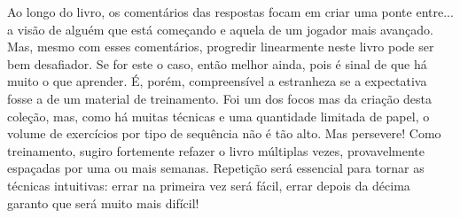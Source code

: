 \documentclass{book}
\begin{document}
  Ao longo do livro, os comentários das respostas focam em criar uma ponte entre... a visão de alguém que está começando e aquela de um jogador mais avançado. Mas, mesmo com esses comentários, progredir linearmente neste livro pode ser bem desafiador. Se for este o caso, então melhor ainda, pois é sinal de que há muito o que aprender. É, porém, compreensível a estranheza se a expectativa fosse a de um material de treinamento. Foi um dos focos mas da criação desta coleção, mas, como há muitas técnicas e uma quantidade limitada de papel, o volume de exercícios por tipo de sequência não é tão alto. Mas persevere! Como treinamento, sugiro fortemente refazer o livro múltiplas vezes, provavelmente espaçadas por uma ou mais semanas. Repetição será essencial para tornar as técnicas intuitivas: errar na primeira vez será fácil, errar depois da décima garanto que será muito mais difícil!
\end{document}
